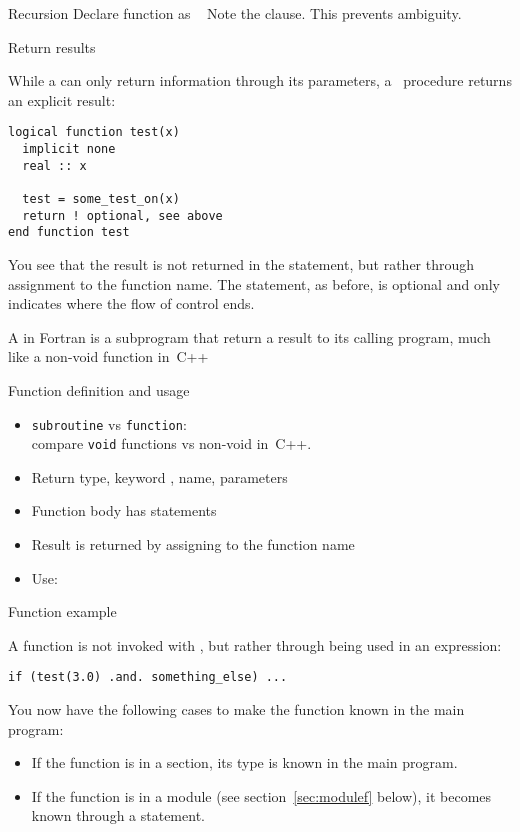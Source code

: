 \begin{block}{Recursion}
  \label{sl:funcf:recursion}
  Declare function as ~
  Note the  clause. This prevents ambiguity.
\end{block}

 {Return results}

While a  can only return information through its parameters,
a~ procedure returns an explicit result:
\begin{lstlisting}
logical function test(x)
  implicit none
  real :: x

  test = some_test_on(x)
  return ! optional, see above
end function test
\end{lstlisting}
You see that the result is not returned in the  statement,
but rather through assignment to the function name. The 
statement, as before, is optional and only indicates where the flow of
control ends.

A  in Fortran is a subprogram that return a
result to its calling program, much like a non-void function in~C++

\begin{block}{Function definition and usage}
  \label{sl:ffunction-def}
  \begin{itemize}
  \item \lstinline$subroutine$ vs \lstinline$function$:\\
    compare \lstinline$void$ functions vs non-void in~C++.
  \item Return type, keyword , name, parameters
  \item Function body has statements
  \item Result is returned by assigning to the function name
  \item Use: 
  \end{itemize}
\end{block}

\begin{block}{Function example}
  \label{sl:ffunction-ex}
\end{block}

A function is not invoked with , but rather through being used
in an expression:
\begin{lstlisting}
if (test(3.0) .and. something_else) ...
\end{lstlisting}
You now have the following cases to make the function known in the
main program:
\begin{itemize}
\item If the function is in a  section, its type is known
  in the main program.
\item If the function is in a module (see section~\ref{sec:modulef}
  below), it becomes known through a  statement.
\end{itemize}

